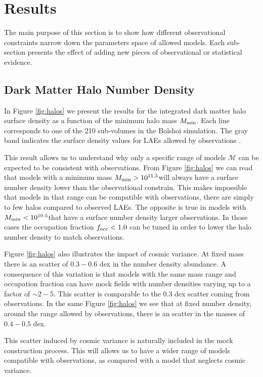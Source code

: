 \documentclass[usenatbib]{mn2e}
\newcommand{\hMsun}{{\ifmmode{h^{-1}{\rm
        {M_{\odot}}}}\else{$h^{-1}{\rm{M_{\odot}}}$}\fi}}
\begin{document}
 
\section{Results}
\label{sec:results}

The main purpose of this section is to show how different
observational constraints narrow down the parameters space of allowed
models. Each sub-section presents the effect of adding new pieces of
observational or statistical evidence. 


\subsection{Dark Matter Halo Number Density}

In Figure \ref{fig:halos} we present the results for  the
integrated dark matter halo surface density as a function of the
minimum halo mass $M_{\rm min}$. Each line corresponds to one of the
210 sub-volumes in the Bolshoi simulation. The gray band indicates the
surface density values for LAEs allowed by observations
\citep{Yamada2012}. 
 
This result allows us to understand why only a specific range of
models ${\mathcal M}$ can be expected to be consistent with
observations. From Figure \ref{fig:halos} we can read that models with
a minimum mass $M_{\rm min}>10^{11.5}$\hMsun will always have a
surface number density lower than the observational constrain. This
makes impossible that models in that range can be compatible with
observations, there are simply to few halos compared to observed
LAEs. The opposite is true in models with $M_{\rm
  min}<10^{10.5}$\hMsun that have a surface number density larger
observations. In those cases the occupation fraction $f_{\rm occ}<1.0$
can be tuned in order to lower the halo number density to match
observations.  


Figure \ref{fig:halos} also illustrates the impact of cosmic
variance. At fixed mass there is an scatter of $0.3-0.6$ dex in the
number density abundance.  A consequence of this variation is that
models with the same mass range and occupation fraction can have mock
fields with number densities varying up to a factor of $\sim
2-5$. This scatter is comparable to the $0.3$ dex scatter coming from 
observations. In the same Figure \ref{fig:halos} we see that at fixed
number density, around the range allowed by observations, there is an
scatter in the masses of $0.4-0.5$ dex.  

This scatter induced by cosmic variance is naturally included in the
mock construction process. This will allows us to have a wider range
of models compatible with observations, as compared with a model that
neglects cosmic variance.
\end{document}
